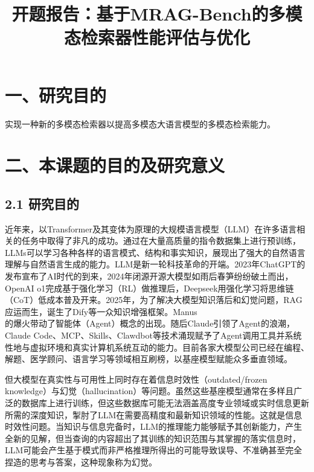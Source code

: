 \documentclass[12pt,a4paper]{article}
\begin{document}
\title{\textbf{开题报告：基于MRAG-Bench的多模态检索器性能评估与优化}}
\author{}
\date{}
\maketitle

\section*{一、研究目的}

实现一种新的多模态检索器以提高多模态大语言模型的多模态检索能力。

\section*{二、本课题的目的及研究意义}

\subsection*{2.1 研究目的}

近年来，以Transformer\cite{vaswani2017attention}及其变体为原理的大规模语言模型（LLM）在许多语言相关的任务中取得了非凡的成功。通过在大量高质量的指令数据集上进行预训练，LLMs可以学习各种各样的语言模式、结构和事实知识，展现出了强大的自然语言理解与自然语言生成的能力\cite{minaee2024llm}。LLM是新一轮科技革命的开端。2023年ChatGPT的发布宣布了AI时代的到来，2024年闭源开源大模型如雨后春笋纷纷破土而出，OpenAI o1完成基于强化学习（RL）做推理后，Deepseek用强化学习将思维链（CoT）低成本普及开来\cite{wei2022cot}。2025年，为了解决大模型知识落后和幻觉问题，RAG\cite{lewis2020rag}应运而生，诞生了Dify\cite{dify2023}等一众知识增强框架。Manus\cite{shen2025manus}的爆火带动了智能体（Agent）\cite{wang2023agent}概念的出现。随后Claude引领了Agent的浪潮，Claude Code\cite{anthropic2024claudecode}、MCP\cite{anthropic2024mcp}、Skills\cite{langchain2024skills}、Clawdbot\cite{clawdbot2025}等技术涌现赋予了Agent调用工具并系统性地与虚拟环境和真实计算机系统互动的能力。目前各家大模型公司已经在编程、解题、医学顾问、语言学习等领域相互刷榜，以基座模型赋能众多垂直领域。

但大模型在真实性与可用性上同时存在着信息时效性（outdated/frozen knowledge）与幻觉（hallucination）等问题\cite{lewis2020rag,gao2023rag}。虽然这些基座模型通常在多样且广泛的数据库上进行训练，但这些数据库可能无法涵盖高度专业领域或实时信息更新所需的深度知识，掣肘了LLM在需要高精度和最新知识领域的性能。这就是信息时效性问题。当知识与信息完备时，LLM的推理能力能够赋予其创新能力，产生全新的见解，但当查询的内容超出了其训练的知识范围与其掌握的落实信息时，LLM可能会产生基于模式而非严格推理所得出的可能导致误导、不准确甚至完全捏造的思考与答案，这种现象称为幻觉。
\end{document}
